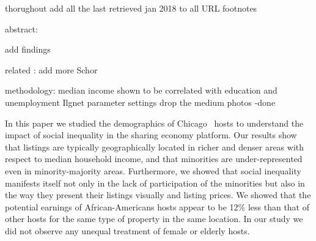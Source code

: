 thorughout add all the last retrieved jan 2018 to all URL footnotes

abstract:

add findings


related :
add more Schor



methodology:
median income shown to be correlated with education and  unemployment
Ilgnet parameter settings
drop the medium photos -done



In this paper we studied the demographics of Chicago \ab \  hosts to understand the impact of  social inequality in the sharing economy platform.  Our results show that listings are typically geographically located in richer and denser areas with respect to median household income, and that minorities are under-represented even in minority-majority areas. Furthermore, we showed that social inequality  manifests itself not only in the lack  of participation of the minorities but also in the way they present their listings visually and listing prices.  We showed that  the potential earnings of  African-Americans hosts appear to be 12\% less than that of other hosts for the same type of property in the same location.  In our study we did not observe any  unequal treatment of female or elderly hosts.  

